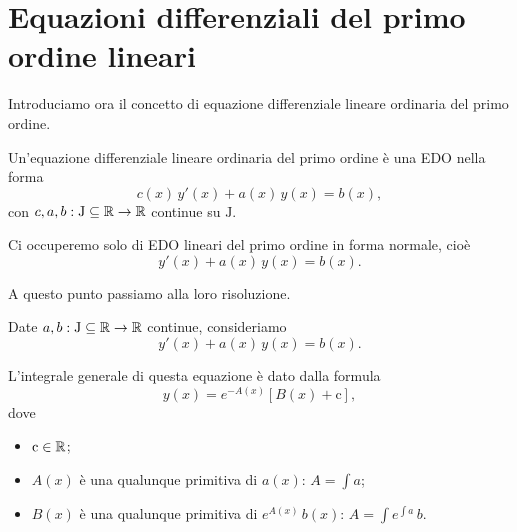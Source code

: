 \documentclass[../../analisi2]{subfiles}
\begin{document}
    \chapter{Equazioni differenziali del primo ordine lineari}

        Introduciamo ora il concetto di equazione differenziale lineare ordinaria del primo ordine.

        \begin{definizione}
            Un'equazione differenziale lineare ordinaria del primo ordine è una EDO nella forma
            \[
                c(x) \, y'(x) + a(x) \, y(x) = b(x),
            \]
            con \(c, a, b : \mathrm{J} \subseteq \mathbb{R} \to \mathbb{R}\) continue su \(\mathrm{J}\).

            Ci occuperemo solo di EDO lineari del primo ordine in forma normale, cioè
            \[
                y'(x) + a(x) \, y(x) = b(x).
            \]
        \end{definizione}

        A questo punto passiamo alla loro risoluzione.

        \begin{teorema}
            Date \(a, b : \mathrm{J} \subseteq \mathbb{R} \to \mathbb{R}\) continue, consideriamo
            \[
                y'(x) + a(x) \, y(x) = b(x).
            \]

            L'integrale generale di questa equazione è dato dalla formula
            \[
                y(x) = e^{-A(x)} \left[B(x) + \mathrm{c}\right],
            \]
            dove
            \begin{itemize}
                \item \(\mathrm{c} \in \mathbb{R}\);
                \item \(A(x)\) è una qualunque primitiva di \(a(x)\): \(A = \int \! a\);
                \item \(B(x)\) è una qualunque primitiva di \(e^{A(x)} \, b(x)\): \(A = \int \! e^{\int \! a} \, b\).
            \end{itemize}
        \end{teorema}
            
\end{document}
